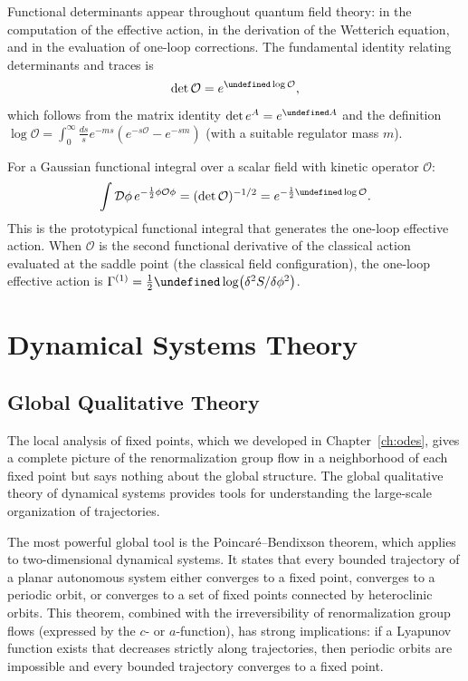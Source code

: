 \documentclass[11pt, twoside, openright]{book}
\theoremstyle{dotted}
\theoremstyle{definition}
\let\tr\undefined
\DeclareMathOperator{\tr}{Tr}          %
\begin{document}
Functional determinants appear throughout quantum field theory: in the computation
of the effective action, in the derivation of the Wetterich equation, and in the
evaluation of one-loop corrections. The fundamental identity relating determinants
and traces is
\begin{equation}
  \det\mathcal{O} = e^{\tr\log\mathcal{O}},
  \label{eq:det_trace}
\end{equation}
which follows from the matrix identity $\det e^A = e^{\tr A}$ and the definition
$\log\mathcal{O} = \int_0^\infty \frac{ds}{s}e^{-ms}(e^{-s\mathcal{O}} - e^{-sm})$
(with a suitable regulator mass $m$).

For a Gaussian functional integral over a scalar field with kinetic operator
$\mathcal{O}$:
\begin{equation}
  \int\mathcal{D}\phi\,e^{-\frac{1}{2}\phi\mathcal{O}\phi} = (\det\mathcal{O})^{-1/2}
  = e^{-\frac{1}{2}\tr\log\mathcal{O}}.
  \label{eq:gaussian_det}
\end{equation}
This is the prototypical functional integral that generates the one-loop effective
action. When $\mathcal{O}$ is the second functional derivative of the classical
action evaluated at the saddle point (the classical field configuration), the
one-loop effective action is $\Gamma^{(1)} = \frac{1}{2}\tr\log(\delta^2 S/\delta\phi^2)$.

\chapter{Dynamical Systems Theory}
\label{ch:dynamical_systems_extended}

\section{Global Qualitative Theory}

The local analysis of fixed points, which we developed in Chapter~\ref{ch:odes},
gives a complete picture of the renormalization group flow in a neighborhood of
each fixed point but says nothing about the global structure. The global qualitative
theory of dynamical systems provides tools for understanding the large-scale
organization of trajectories.

The most powerful global tool is the Poincaré--Bendixson theorem, which applies
to two-dimensional dynamical systems. It states that every bounded trajectory of
a planar autonomous system either converges to a fixed point, converges to a
periodic orbit, or converges to a set of fixed points connected by heteroclinic
orbits. This theorem, combined with the irreversibility of renormalization group
flows (expressed by the $c$- or $a$-function), has strong implications: if a
Lyapunov function exists that decreases strictly along trajectories, then periodic
orbits are impossible and every bounded trajectory converges to a fixed point.
\end{document}

